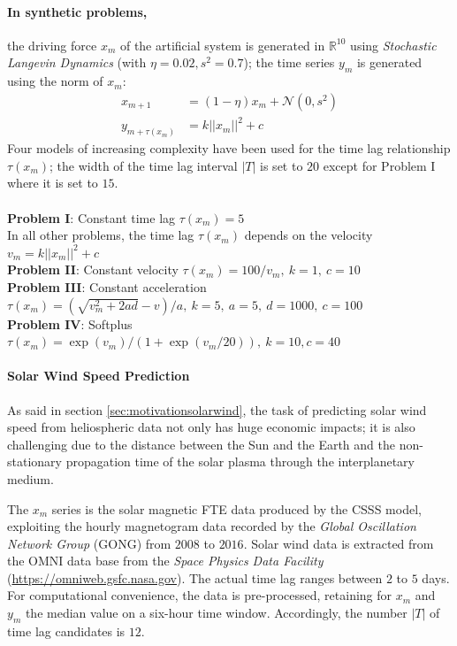 
\paragraph{In synthetic problems,} the driving force $x_m$ of the artificial system is generated in $\mathbb{R}^{10}$ using \emph{Stochastic Langevin Dynamics} (with $\eta = 0.02, s^2 = 0.7$); the time series $y_m$ is generated using the norm of $x_m$:
% 
\begin{align}
 x_{m+1} &= (1 - \eta) x_m + \mathcal{N}(0, s^2) \label{eq:data}\\
 y_{m+\tau(x_m)} &= k ||x_m||^2 + c \label{eq:outputs}
\end{align}
%
Four models of increasing complexity have been used for the time lag relationship $\tau(x_m)$; the width of 
the time lag interval $|T|$ is set to $20$ except for Problem I where it is set to $15$.\\\\
%
{\bf Problem I}: Constant time lag $\tau(x_m) = 5$\\
%
In all other problems, the time lag $\tau(x_m)$ depends on the velocity $v_m = k ||x_m||^2 + c$\\
%
{\bf Problem II}: Constant velocity $\tau(x_m) = 100/v_m,\ k = 1,\ c = 10$\\
%
{\bf Problem III}: Constant acceleration $\tau(x_m) = (\sqrt{v_m^2 + 2ad} - v)/a,\ k = 5,\ a = 5,\ d = 1000, \ c = 100$
\\
%
{\bf Problem IV}: Softplus $\tau(x_m) = \exp\left(v_m\right)/\left(1 + \exp(v_m/20)\right), \ k = 10, c = 40$\\

\paragraph{Solar Wind Speed Prediction}\label{sec:solarwind}
As said in section \ref{sec:motivationsolarwind}, the task of predicting solar wind speed from heliospheric 
data not only has huge economic impacts; it is also challenging due to the distance between the Sun and the 
Earth and the non-stationary propagation time of the solar plasma through the interplanetary medium. 

The $x_m$ series is the solar magnetic FTE data produced by the CSSS model, exploiting the hourly magnetogram 
data recorded by the \emph{Global Oscillation Network Group} (GONG) from $2008$ to $2016$.
Solar wind data is extracted from the OMNI data base from the \emph{Space Physics Data Facility}
(\url{https://omniweb.gsfc.nasa.gov}). The actual time lag ranges between $2$ to $5$ days. For 
computational convenience, the data is pre-processed, retaining for $x_m$ and $y_m$ the median value on a 
six-hour time window. Accordingly, the number $|T|$ of time lag candidates is $12$.  

